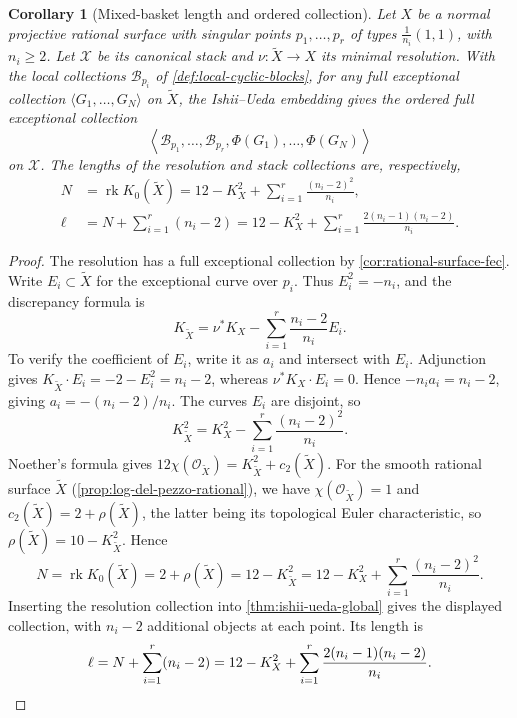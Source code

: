 \documentclass[11pt]{article}
\theoremstyle{plain}
\newtheorem{corollary}[corollary]{Corollary}
\theoremstyle{definition}
\theoremstyle{remark}
\newcommand{\rk}{\operatorname{rk}}
\newcommand{\XX}{\mathcal X}
\newcommand{\OO}{\mathcal O}
\begin{document}
\begin{corollary}[Mixed-basket length and ordered collection]
\label{cor:mixed-basket-length}
Let \(X\) be a normal projective rational surface with singular
points \(p_1,\ldots,p_r\) of types \(\frac1{n_i}(1,1)\), with
\(n_i\geq2\). Let \(\XX\) be its canonical stack and
\(\nu:\widetilde X\to X\) its minimal resolution. With the local
collections \(\mathscr B_{p_i}\) of \cref{def:local-cyclic-blocks},
for any full exceptional collection
\(\langle G_1,\ldots,G_N\rangle\) on \(\widetilde X\), the
Ishii--Ueda embedding gives the ordered
full exceptional collection
\[
\left\langle
\mathscr B_{p_1},\ldots,\mathscr B_{p_r},
\Phi(G_1),\ldots,\Phi(G_N)
\right\rangle
\]
on \(\XX\). The lengths of the resolution and stack collections are,
respectively,
\[
\begin{aligned}
N&=\rk K_0(\widetilde X)
=12-K_X^2+\sum_{i=1}^r\frac{(n_i-2)^2}{n_i},\\
\ell&=N+\sum_{i=1}^r(n_i-2)
=12-K_X^2+\sum_{i=1}^r
\frac{2(n_i-1)(n_i-2)}{n_i}.
\end{aligned}
\]
\end{corollary}

\begin{proof}
The resolution has a full exceptional collection by
\cref{cor:rational-surface-fec}. Write \(E_i\subset\widetilde X\)
for the exceptional curve over \(p_i\). Thus \(E_i^2=-n_i\), and the
discrepancy formula is
\[
K_{\widetilde X}
=
\nu^*K_X-\sum_{i=1}^r\frac{n_i-2}{n_i}E_i.
\]
To verify the coefficient of \(E_i\), write it as \(a_i\) and
intersect with \(E_i\). Adjunction gives
\(K_{\widetilde X}\cdot E_i=-2-E_i^2=n_i-2\), whereas
\(\nu^*K_X\cdot E_i=0\). Hence
\(-n_i a_i=n_i-2\), giving \(a_i=-(n_i-2)/n_i\).
The curves \(E_i\) are disjoint, so
\[
K_{\widetilde X}^2
=K_X^2-\sum_{i=1}^r\frac{(n_i-2)^2}{n_i}.
\]
Noether's formula
\cite[Appendix~A, Example~4.1.2]{Hartshorne1977} gives
\(12\chi(\OO_{\widetilde X})=K_{\widetilde X}^2+c_2(\widetilde X)\).
For the smooth rational surface \(\widetilde X\)
(\cref{prop:log-del-pezzo-rational}), we have
\(\chi(\OO_{\widetilde X})=1\) and
\(c_2(\widetilde X)=2+\rho(\widetilde X)\), the latter being its
topological Euler characteristic, so
\(\rho(\widetilde X)=10-K_{\widetilde X}^2\). Hence
\[
N=\rk K_0(\widetilde X)=2+\rho(\widetilde X)
=12-K_{\widetilde X}^2
=12-K_X^2+\sum_{i=1}^r\frac{(n_i-2)^2}{n_i}.
\]
Inserting the resolution collection into
\cref{thm:ishii-ueda-global} gives the displayed collection, with
\(n_i-2\) additional objects at each point. Its length is
\[
\ell=N+\sum_{i=1}^r(n_i-2)
=12-K_X^2+\sum_{i=1}^r
\frac{2(n_i-1)(n_i-2)}{n_i}.\qedhere
\]
\end{proof}
\end{document}
